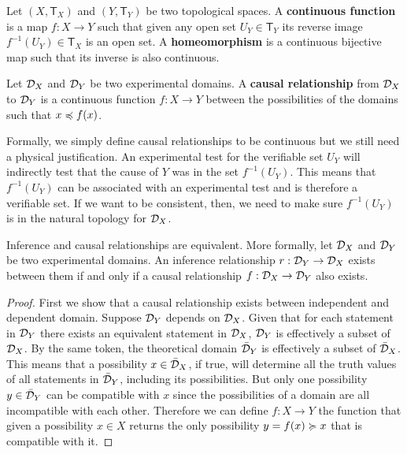 \documentclass[11pt,letterpaper,fleqn]{memoir} %
\begin{document}
\begin{mathSection}
	\begin{defn}
		Let $(X, \mathsf{T}_X)$ and $(Y, \mathsf{T}_Y)$ be two topological spaces. A \textbf{continuous function} is a map $f: X \to Y$ such that given any open set $U_Y \in \mathsf{T}_Y$ its reverse image $f^{-1}(U_Y) \in \mathsf{T}_X$ is an open set. A \textbf{homeomorphism} is a continuous bijective map such that its inverse is also continuous.
	\end{defn}
	\begin{defn}
		Let $\mathcal{D}_X$ and $\mathcal{D}_Y$ be two experimental domains. A \textbf{causal relationship} from $\mathcal{D}_X$ to $\mathcal{D}_Y$ is a continuous function $f : X \to Y$ between the possibilities of the domains such that $x \preccurlyeq f(x)$.
	\end{defn}
	\begin{justification}
		Formally, we simply define causal relationships to be continuous but we still need a physical justification. An experimental test for the verifiable set $U_Y$ will indirectly test that the cause of $Y$ was in the set $f^{-1}(U_Y)$. This means that $f^{-1}(U_Y)$ can be associated with an experimental test and is therefore a verifiable set. If we want to be consistent, then, we need to make sure $f^{-1}(U_Y)$ is in the natural topology for $\mathcal{D}_X$.
	\end{justification}
	\begin{thrm}
		Inference and causal relationships are equivalent. More formally, let $\mathcal{D}_X$ and $\mathcal{D}_Y$ be two experimental domains. An inference relationship $r: \mathcal{D}_Y \to \mathcal{D}_X$ exists between them if and only if a causal relationship $f: \mathcal{D}_X \to \mathcal{D}_Y$ also exists.
	\end{thrm}
	\begin{proof}
		First we show that a causal relationship exists between independent and dependent domain. Suppose $\mathcal{D}_Y$ depends on $\mathcal{D}_X$. Given that for each statement in $\mathcal{D}_Y$ there exists an equivalent statement in $\mathcal{D}_X$, $\mathcal{D}_Y$ is effectively a subset of $\mathcal{D}_X$. By the same token, the theoretical domain $\bar{\mathcal{D}}_Y$ is effectively a subset of $\bar{\mathcal{D}}_X$. This means that a possibility $x \in \bar{\mathcal{D}}_X$, if true, will determine all the truth values of  all statements in $\bar{\mathcal{D}}_Y$, including its possibilities. But only one possibility $y \in \bar{\mathcal{D}}_Y$ can be compatible with $x$ since the possibilities of a domain are all incompatible with each other. Therefore we can define $f : X \to Y$ the function that given a possibility $x \in X$ returns the only possibility $y=f(x) \succcurlyeq x$ that is compatible with it.
		

\end{proof}
\end{mathSection}
\end{document}
